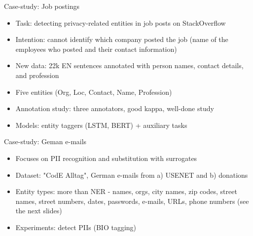 \documentclass[12pt,aspectratio=169,handout]{beamer}
\begin{document}
\begin{frame}{Case-study: Job postings}

\begin{itemize}
\item Task: detecting privacy-related entities in job posts on StackOverflow
\item Intention: cannot identify which company posted the job (name of the employees who posted and their contact information)
\item New data: 22k EN sentences annotated with person names, contact details, and profession
\item Five entities (Org, Loc, Contact, Name, Profession)
\item Annotation study: three annotators, good kappa, well-done study
\item Models: entity taggers (LSTM, BERT) + auxiliary tasks
\end{itemize}


\end{frame}




\begin{frame}{Case-study: Geman e-mails}

\begin{itemize}
\item Focuses on PII recognition and substitution with surrogates
\item Dataset: "CodE Alltag", German e-mails from a) USENET and b) donations
\item Entity types: more than NER - names, orgs, city names, zip codes, street names, street numbers, dates, passwords, e-mails, URLs, phone numbers (see the next slides)
\item Experiments: detect PIIs (BIO tagging)
\end{itemize}


\end{frame}
\end{document}
